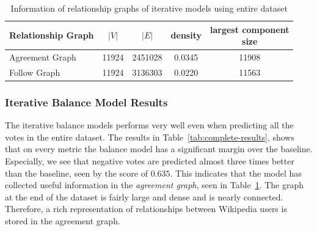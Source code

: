 \begin{table}[htp]
    \centering
    \caption{Information of relationship graphs of iterative models using entire \wikirfa dataset}
    \label{tab:iterative-graphs}
    \begin{tabular}{lcccc}
        \toprule
        Relationship Graph & $|V|$ & $|E|$ & density & \shortstack{largest component \\size}\\
        \midrule
        
        Agreement Graph& 11924 &2451028 & 0.0345 & 11908\\
        
        Follow Graph & 11924 & 3136303 & 0.0220 & 11563 \\


        \bottomrule
        \end{tabular}
\end{table}

\subsubsection{Iterative Balance Model Results}
The iterative balance models performs very well even when predicting all the votes in the entire \wikirfa dataset.
The results in Table~\ref{tab:complete-results}, shows that on every metric the balance model has a significant margin over the baseline.
Especially, we see that negative votes are predicted almost three times better than the baseline, seen by the \aucnegPR score of $0.635$.
This indicates that the model has collected useful information in the \textit{agreement graph}, seen in Table~\ref{tab:iterative-graphs}.
The graph at the end of the dataset is fairly large and dense and is nearly connected.
Therefore, a rich representation of relationships between Wikipedia users is stored in the agreement graph.

